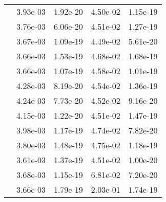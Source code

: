 \begin{table}
\begin{tabular}{c|cc|cc|}
\multicolumn{1}{|c|}{} & \multicolumn{1}{|c|}{  3.93e-03} & \multicolumn{1}{|c|}{  1.92e-20} & \multicolumn{1}{|c|}{  4.50e-02} & \multicolumn{1}{|c|}{  1.15e-19} \\ 
\multicolumn{1}{|c|}{} & \multicolumn{1}{|c|}{  3.76e-03} & \multicolumn{1}{|c|}{  6.06e-20} & \multicolumn{1}{|c|}{  4.51e-02} & \multicolumn{1}{|c|}{  1.27e-19} \\ 
\multicolumn{1}{|c|}{} & \multicolumn{1}{|c|}{  3.67e-03} & \multicolumn{1}{|c|}{  1.09e-19} & \multicolumn{1}{|c|}{  4.49e-02} & \multicolumn{1}{|c|}{  5.61e-20} \\ 
\multicolumn{1}{|c|}{} & \multicolumn{1}{|c|}{  3.66e-03} & \multicolumn{1}{|c|}{  1.53e-19} & \multicolumn{1}{|c|}{  4.68e-02} & \multicolumn{1}{|c|}{  1.68e-19} \\ 
\multicolumn{1}{|c|}{} & \multicolumn{1}{|c|}{  3.66e-03} & \multicolumn{1}{|c|}{  1.07e-19} & \multicolumn{1}{|c|}{  4.58e-02} & \multicolumn{1}{|c|}{  1.01e-19} \\ 
\multicolumn{1}{|c|}{} & \multicolumn{1}{|c|}{  4.28e-03} & \multicolumn{1}{|c|}{  8.19e-20} & \multicolumn{1}{|c|}{  4.54e-02} & \multicolumn{1}{|c|}{  1.36e-19} \\ 
\multicolumn{1}{|c|}{} & \multicolumn{1}{|c|}{  4.24e-03} & \multicolumn{1}{|c|}{  7.73e-20} & \multicolumn{1}{|c|}{  4.52e-02} & \multicolumn{1}{|c|}{  9.16e-20} \\ 
\multicolumn{1}{|c|}{} & \multicolumn{1}{|c|}{  4.15e-03} & \multicolumn{1}{|c|}{  1.22e-20} & \multicolumn{1}{|c|}{  4.51e-02} & \multicolumn{1}{|c|}{  1.47e-19} \\ 
\multicolumn{1}{|c|}{} & \multicolumn{1}{|c|}{  3.98e-03} & \multicolumn{1}{|c|}{  1.17e-19} & \multicolumn{1}{|c|}{  4.74e-02} & \multicolumn{1}{|c|}{  7.82e-20} \\ 
\multicolumn{1}{|c|}{} & \multicolumn{1}{|c|}{  3.80e-03} & \multicolumn{1}{|c|}{  1.48e-19} & \multicolumn{1}{|c|}{  4.75e-02} & \multicolumn{1}{|c|}{  1.18e-19} \\ 
\multicolumn{1}{|c|}{} & \multicolumn{1}{|c|}{  3.61e-03} & \multicolumn{1}{|c|}{  1.37e-19} & \multicolumn{1}{|c|}{  4.51e-02} & \multicolumn{1}{|c|}{  1.00e-20} \\ 
\multicolumn{1}{|c|}{} & \multicolumn{1}{|c|}{  3.68e-03} & \multicolumn{1}{|c|}{  1.15e-19} & \multicolumn{1}{|c|}{  6.81e-02} & \multicolumn{1}{|c|}{  7.20e-20} \\ 
\multicolumn{1}{|c|}{} & \multicolumn{1}{|c|}{  3.66e-03} & \multicolumn{1}{|c|}{  1.79e-19} & \multicolumn{1}{|c|}{  2.03e-01} & \multicolumn{1}{|c|}{  1.74e-19} \\ 

\end{tabular}
\end{table}
